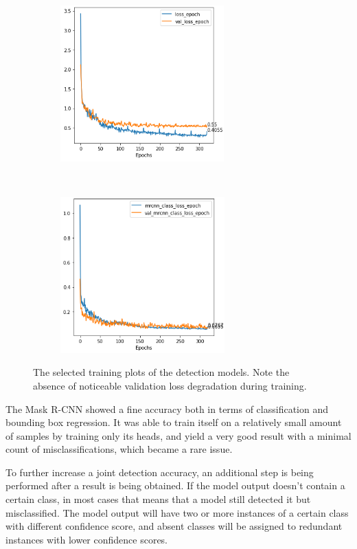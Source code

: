 \documentclass[thesis=B,english]{FITthesis}[2019/12/23]
\begin{document}
\begin{figure}[h]
	\begin{subfigure}[b]{.48\textwidth}
		\centering
		\includegraphics[height=6cm]{images/wrist_erosion_loss.png}
	\end{subfigure}
	~
	\begin{subfigure}[b]{.48\textwidth}
		\centering
		\includegraphics[height=6cm]{images/wrist_narrowing_class_loss.png}
	\end{subfigure}
	
	
	\caption{The selected training plots of the detection models. Note the absence of noticeable validation loss degradation during training.}
\end{figure}

The Mask R-CNN showed a fine accuracy both in terms of classification and bounding box regression. It was able to train itself on a relatively small amount of samples by training only its heads, and yield a very good result with a minimal count of misclassifications, which became a rare issue.

To further increase a joint detection accuracy, an additional step is being performed after a result is being obtained. If the model output doesn't contain a certain class, in most cases that means that a model still detected it but misclassified. The model output will have two or more instances of a certain class with different confidence score, and absent classes will be assigned to redundant instances with lower confidence scores.
\end{document}
